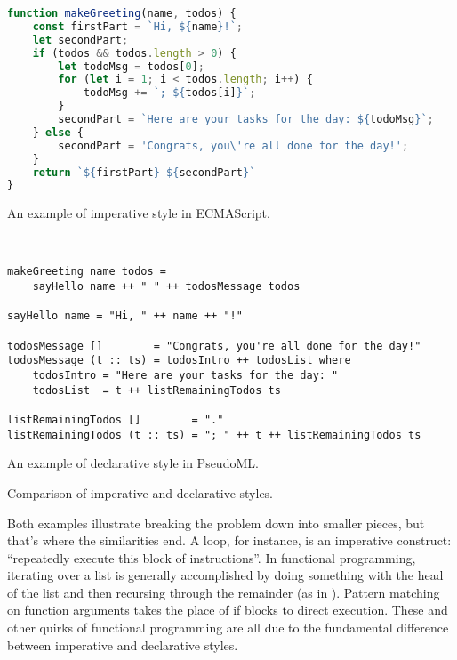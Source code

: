 \begin{listing}
\begin{sublisting}{\linewidth}
\begin{lstlisting}[language=js]
function makeGreeting(name, todos) {
    const firstPart = `Hi, ${name}!`;
    let secondPart;
    if (todos && todos.length > 0) {
        let todoMsg = todos[0];
        for (let i = 1; i < todos.length; i++) {
            todoMsg += `; ${todos[i]}`;
        }
        secondPart = `Here are your tasks for the day: ${todoMsg}`;
    } else {
        secondPart = 'Congrats, you\'re all done for the day!';
    }
    return `${firstPart} ${secondPart}`
}
\end{lstlisting}
\caption{An example of imperative style in ECMAScript.}\label{lst:compare-id-imperative}
\end{sublisting}
\\[0.1\textheight]
\begin{sublisting}{\linewidth}
\begin{lstlisting}[language=pseudoml]
makeGreeting name todos =
    sayHello name ++ " " ++ todosMessage todos 

sayHello name = "Hi, " ++ name ++ "!"

todosMessage []        = "Congrats, you're all done for the day!"
todosMessage (t :: ts) = todosIntro ++ todosList where
    todosIntro = "Here are your tasks for the day: " 
    todosList  = t ++ listRemainingTodos ts

listRemainingTodos []        = "."
listRemainingTodos (t :: ts) = "; " ++ t ++ listRemainingTodos ts
\end{lstlisting}
\caption{An example of declarative style in PseudoML.}\label{lst:compare-id-declarative}
\end{sublisting}
\caption{Comparison of imperative and declarative styles.}\label{lst:compare-imperative-declarative}
\end{listing}

Both examples illustrate breaking the problem down into smaller pieces, but that's where the similarities end. A loop, for instance, is an imperative construct: ``repeatedly execute this block of instructions''. In functional programming, iterating over a list is generally accomplished by doing something with the head of the list and then recursing through the remainder (as in ). Pattern matching on function arguments takes the place of if blocks to direct execution. These and other quirks of functional programming are all due to the fundamental difference between imperative and declarative styles.

